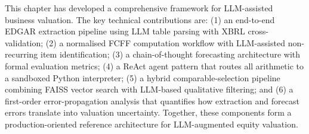 \begin{remark}
\label{rem:ch5-summary}
This chapter has developed a comprehensive framework for LLM-assisted business
valuation. The key technical contributions are: (1) an end-to-end EDGAR extraction
pipeline using LLM table parsing with XBRL cross-validation; (2) a normalised FCFF
computation workflow with LLM-assisted non-recurring item identification; (3) a
chain-of-thought forecasting architecture with formal evaluation metrics; (4) a
ReAct agent pattern that routes all arithmetic to a sandboxed Python interpreter;
(5) a hybrid comparable-selection pipeline combining FAISS vector search with
LLM-based qualitative filtering; and (6) a first-order error-propagation analysis
that quantifies how extraction and forecast errors translate into valuation uncertainty.
Together, these components form a production-oriented reference architecture for
LLM-augmented equity valuation.
\end{remark}
